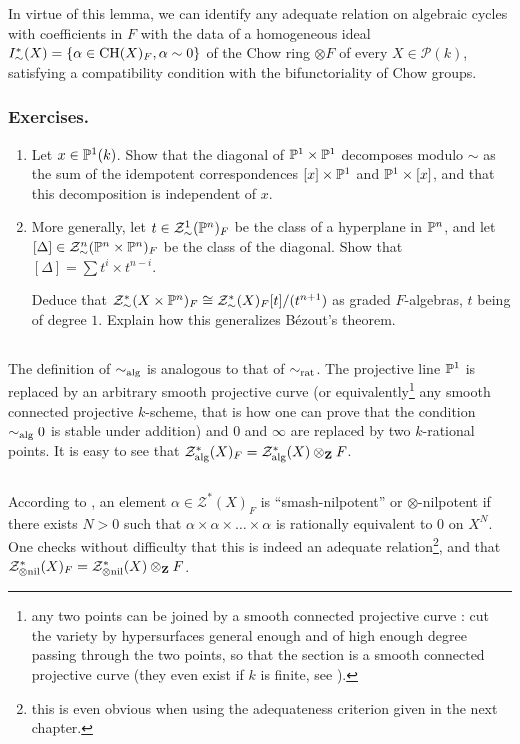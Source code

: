 \documentclass[../main.tex]{subfiles}
\begin{document}
In virtue of this lemma, we can identify any adequate relation on algebraic cycles with coefficients in $F$ with the data of a homogeneous ideal $I^*_{\sim}(X) = \{\alpha \in \CH(X)_F, \alpha \sim 0\}$ of the Chow ring $\otimes F$ of every $X \in \mathcal{P}(k)$, satisfying a compatibility condition with the bifunctoriality of Chow groups.

\subsubsection{Exercises.}
\begin{enumerate}[label=\arabic*)]
    \item Let $x \in \P^1(k)$. Show that the diagonal of $\P^1 \times \P^1$ decomposes modulo $\sim$ as the sum of the idempotent correspondences $[x] \times \P^1$ and $\P^1 \times [x]$, and that this decomposition is independent of $x$.
    \item More generally, let $t \in \mathcal{Z}^1_{\sim}(\P^n)_F$ be the class of a hyperplane in $\P^n$, and let $[\Delta] \in \mathcal{Z}^n_{\sim}(\P^n \times \P^n)_F$ be the class of the diagonal.
    Show that $[\Delta] = \sum t^i \times t^{n-i}$.

    Deduce that $\mathcal{Z}^*_{\sim}(X \times \P^n)_F \cong \mathcal{Z}^*_{\sim}(X)_F[t]/(t^{n+1})$ as graded $F$-algebras, $t$ being of degree $1$. Explain how this generalizes Bézout's theorem.
\end{enumerate}

\subsection{} The definition of $\sim_{\alg}$ is analogous to that of $\sim_{\rat}$.
The projective line $\P^1$ is replaced by an arbitrary smooth projective curve (or equivalently\footnote{any two points can be joined by a smooth connected projective curve : cut the variety by hypersurfaces general enough and of high enough degree passing through the two points, so that the section is a smooth connected projective curve (they even exist if $k$ is finite, see \cite{poonen}).} any smooth connected projective $k$-scheme, that is how one can prove that the condition $\sim_{\alg} 0$ is stable under addition) and $0$ and $\infty$ are replaced by two $k$-rational points.
It is easy to see that $\mathcal{Z}^*_{\alg}(X)_F = \mathcal{Z}^*_{\alg}(X) \otimes_{\Z} F$.

\subsection{} According to \cite{voevodsky95}, an element $\alpha \in \mathcal{Z}^*(X)_F$ is \enquote{smash-nilpotent} or $\otimes$-nilpotent if there exists $N > 0$ such that $\alpha \times \alpha \times \dots \times \alpha$ is rationally equivalent to $0$ on $X^N$.
One checks without difficulty that this is indeed an adequate relation\footnote{this is even obvious when using the adequateness criterion given in the next chapter.}, and that $\mathcal{Z}^*_{\otimes\nil}(X)_F = \mathcal{Z}^*_{\otimes\nil}(X) \otimes_{\Z} F$.
\end{document}
